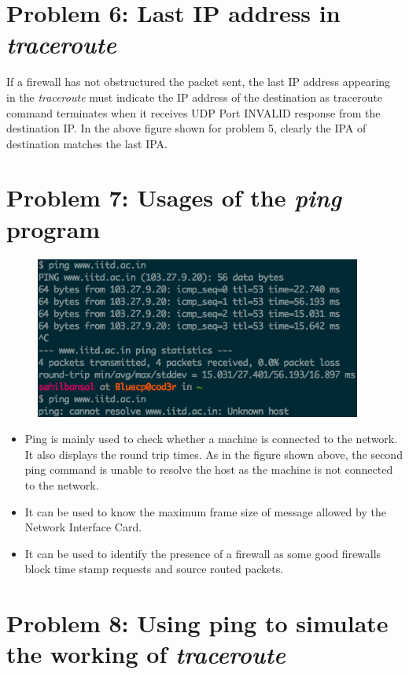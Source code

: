 \documentclass[]{report}
\begin{document}
\section{Problem 6: Last IP address in \textit{traceroute}}
If a firewall has not obstructured the packet sent, the last IP address appearing in the \textit{traceroute} must indicate the IP address of the destination as traceroute command terminates when it receives UDP Port INVALID response from the destination IP. In the above figure shown for problem 5, clearly the IPA of destination matches the last IPA.

\section{Problem 7: Usages of the \textit{ping} program}
\begin{figure}[H]
	\vspace{0pt}
	\includegraphics[height = 150pt, keepaspectratio]{Snapshots/exe7/q7_1.png}
\end{figure} 
\begin{itemize}
	\item Ping is mainly used to check whether a machine is connected to the network. It also displays the round trip times. As in the figure shown above, the second ping command is unable to resolve the host as the machine is not connected to the network.
	\item It can be used to know the maximum frame size of message allowed by the Network Interface Card. 
	\item It can be used to identify the presence of a firewall as some good firewalls block time stamp requests and source routed packets. 
\end{itemize}
\section{Problem 8: Using ping to simulate the working of \textit{traceroute}}
\end{document}
